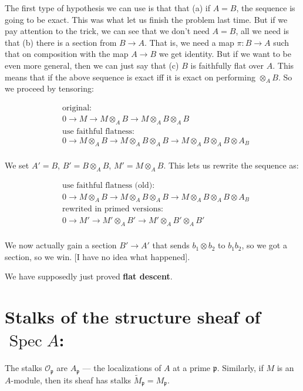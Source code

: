 \documentclass{book}
\renewcommand{\O}{\ensuremath{\mathcal{O}}}
\newcommand{\spec}{\operatorname{Spec}}
\newcommand{\p}{\mathfrak{p}}
\theoremstyle{definition}
\begin{document}
The first type of hypothesis we can use is that that
(a) if $A = B$, the sequence is going to be exact. This was
what let us finish the problem last time. But if we pay attention to the trick,
we can see that we don't need $A = B$, all we need is that (b) there is a section from $B \rightarrow A$.
That is, we need a map $\pi: B \rightarrow A$ such that on composition with the map $A \rightarrow B$
we get identity.  But if we want to be even more general, then we can just say
that (c) $B$ is faithfully flat over $A$. This means that if the above sequence
is exact iff it is exact on performing $\otimes_A B$. So we proceed by
tensoring:

\begin{align*}
&\text{original:} \\
&0 \rightarrow M \rightarrow M \otimes_A B \rightarrow M \otimes_A B \otimes_A B  \\
&\text{use faithful flatness:} \\
&0 \rightarrow M \otimes_A B \rightarrow M \otimes_A B \otimes_A B\rightarrow M \otimes_A B \otimes_A B \otimes A_B \\
\end{align*}

We set $A' = B$, $B' = B \otimes_A B$, $M' = M \otimes_A B$. This lets us
rewrite the sequence as:


\begin{align*}
&\text{use faithful flatness (old):} \\
&0 \rightarrow M \otimes_A B \rightarrow M \otimes_A B \otimes_A B\rightarrow M \otimes_A B \otimes_A B \otimes A_B \\
&\text{rewrited in primed versions:} \\
&0 \rightarrow M' \rightarrow M' \otimes_A B' \rightarrow M' \otimes_A B' \otimes_A B'  \\
\end{align*}

We now actually gain a section $B' \rightarrow A'$ that sends $b_1 \otimes b_2$ to $b_1 b_2$,
so we got a section, so we win. [I have no idea what happened].

We have supposedly just proved \textbf{flat descent}.


\section{Stalks of the structure sheaf of $\spec A$:}

The stalks $\O_\p$ are $A_\p$ --- the localizations of $A$ at a prime $\p$.
Similarly, if $M$ is an $A$-module, then its sheaf has stalks $\tilde M_\p = M_\p$.
\end{document}
